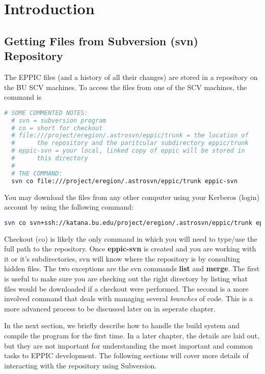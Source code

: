 

\chapter{Introduction}

\section{Getting Files from Subversion (svn) Repository}

The EPPIC files (and a history of all their changes) are stored in a
repository on the BU SCV machines. To  
access the files from one of the SCV machines, the command is

\begin{lstlisting}[language=BASH]
  # SOME COMMENTED NOTES:
  # svn = subversion program
  # co = short for checkout
  # file:///project/eregion/.astrosvn/eppic/trunk = the location of
  #      the repository and the paritcular subdirectory eppic/trunk  
  # eppic-svn = your local, linked copy of eppic will be stored in
  #      this directory 
  # 
  # THE COMMAND:
  svn co file:///project/eregion/.astrosvn/eppic/trunk eppic-svn
\end{lstlisting}

You may download the files from any other computer using your Kerberos
(login) account by using the following command:

\begin{lstlisting}[language=BASH]
  svn co svn+ssh://katana.bu.edu/project/eregion/.astrosvn/eppic/trunk eppic-svn
\end{lstlisting}

Checkout (co) is likely the only command in which you will need to
type/use the full path to the repository. Once \textbf{eppic-svn} is
created and you are working with it or it's subdirectories, svn will
know where the repository is by consulting hidden files. The two
exceptions are the svn commands 
\textbf{list} and \textbf{merge}. The first is useful to make sure you
are checking out the right directory by listing what files would be
downloaded if a checkout were performed. The second is a more involved
command that deals with managing several \emph{branches} of code. This
is a more advanced process to be discussed later on in seperate
chapter. 

In the next section, we briefly describe how to handle the build
system and compile the program for the first time. In a later chapter,
the details are laid out, but they are not important for understanding
the most important and common tasks to EPPIC development. The
following sections will cover more details of interacting with the
repository using Subversion.

